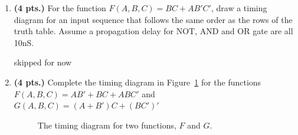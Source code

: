 \begin{enumerate}
\item {\bf (4 pts.)} For the function $F(A,B,C)= BC+AB'C'$,  draw
a timing diagram for an input sequence that follows the same order 
as the rows of the truth table.  Assume a propagation delay for NOT, 
AND and OR gate are all 10nS.

	\begin{solution}{skipped for now}\end{solution}

\item {\bf (4 pts.)} Complete the timing diagram in Figure~\ref{fig:HWtime}
for the functions
$F(A,B,C) = AB' + BC + ABC'$ and $G(A,B,C) = (A+B')C + (BC')'$
\begin{figure}[ht]
\caption{The timing diagram for two functions, $F$ and $G$.}
\label{fig:HWtime}
\end{figure}

\begin{solution}{

\begin{figure}[ht]
\end{figure}
}\end{solution}


\end{enumerate}
